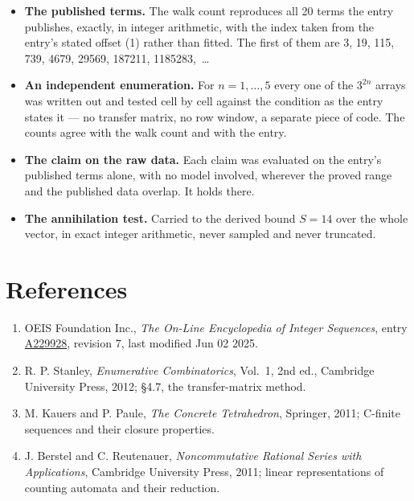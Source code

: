 \documentclass[11pt]{article}
\theoremstyle{definition}
\begin{document}
\begin{itemize}

\item {\bfseries The published terms.} The walk count reproduces all 20 terms the entry publishes, exactly, in integer arithmetic, with the index taken from the entry's stated offset (1) rather than fitted. The first of them are 3, 19, 115, 739, 4679, 29569, 187211, 1185283,~\dots

\item {\bfseries An independent enumeration.} For $n = 1,\dots,5$ every one of the $3^{2n}$ arrays was written out and tested cell by cell against the condition as the entry states it --- no transfer matrix, no row window, a separate piece of code. The counts agree with the walk count and with the entry.

\item {\bfseries The claim on the raw data.} Each claim was evaluated on the entry's published terms alone, with no model involved, wherever the proved range and the published data overlap. It holds there.

\item {\bfseries The annihilation test.} Carried to the derived bound $S = 14$ over the whole vector, in exact integer arithmetic, never sampled and never truncated.

\end{itemize}

\section{References}

\begin{enumerate}

\item OEIS Foundation Inc., \emph{The On-Line Encyclopedia of Integer Sequences}, entry \href{https://oeis.org/A229928}{A229928}, revision 7, last modified Jun 02 2025.

\item R. P. Stanley, \emph{Enumerative Combinatorics}, Vol.~1, 2nd ed., Cambridge University Press, 2012; \S4.7, the transfer-matrix method.

\item M. Kauers and P. Paule, \emph{The Concrete Tetrahedron}, Springer, 2011; C-finite sequences and their closure properties.

\item J. Berstel and C. Reutenauer, \emph{Noncommutative Rational Series with Applications}, Cambridge University Press, 2011; linear representations of counting automata and their reduction.

\end{enumerate}
\end{document}
